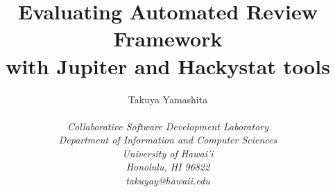 \documentclass[11pt,twocolumn]{article}
\begin{document}
\title{Evaluating Automated Review Framework \\ with Jupiter and Hackystat tools}

\author{\protect\begin{tabular}{ccc}
Takuya Yamashita  \\
\end{tabular}\\
\em  Collaborative Software Development Laboratory \\
\em  Department of Information and Computer Sciences \\
\em  University of Hawai'i \\
\em  Honolulu, HI 96822 \\
\em  takuyay@hawaii.edu} \maketitle \thispagestyle{empty}
\end{document}
